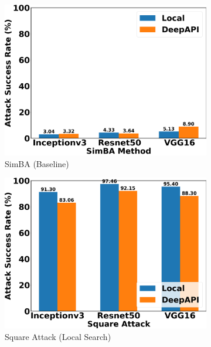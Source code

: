 \begin{figure}[tbp]
\centering
\begin{subfigure}[b]{0.6\textwidth}
    \centering
    \includegraphics[width=\textwidth]{figures/chapter_classification/simba_attack_success_rate.png}
    \caption{SimBA (Baseline)}
    \label{fig:simba_suc}
\end{subfigure}
\hfill
\begin{subfigure}[b]{0.6\textwidth}
    \centering
    \includegraphics[width=\textwidth]{figures/chapter_classification/square_attack_success_rate.png}
    \caption{Square Attack (Local Search)}
    \label{fig:square_suc}
\end{subfigure}
\hfill
\begin{subfigure}[b]{0.6\textwidth}

\end{subfigure}
\end{figure}
